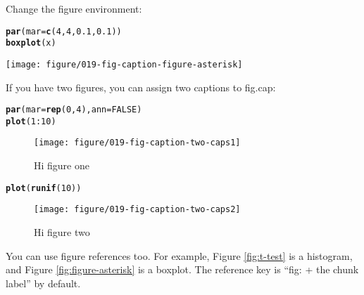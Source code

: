 \documentclass{article}\usepackage{graphicx, color}
\makeatletter
\def\maxwidth{ %
  \ifdim\Gin@nat@width>\linewidth
    \linewidth
  \else
    \Gin@nat@width
  \fi
}
\newcommand{\hlfunctioncall}[1]{\textcolor[rgb]{0.501960784313725,0,0.329411764705882}{\textbf{#1}}}%
\newenvironment{kframe}{%
 \def\at@end@of@kframe{}%
 \ifinner\ifhmode%
  \def\at@end@of@kframe{\end{minipage}}%
  \begin{minipage}{\columnwidth}%
 \fi\fi%
 \def\FrameCommand##1{\hskip\@totalleftmargin \hskip-\fboxsep
 \colorbox{shadecolor}{##1}\hskip-\fboxsep
     \hskip-\linewidth \hskip-\@totalleftmargin \hskip\columnwidth}%
 \MakeFramed {\advance\hsize-\width
   \@totalleftmargin\z@ \linewidth\hsize
   \@setminipage}}%
 {\par\unskip\endMakeFramed%
 \at@end@of@kframe}
\newenvironment{knitrout}{}{} %
\makeatother
\begin{document}
Change the figure environment:

\begin{knitrout}
\color{fgcolor}\begin{kframe}
\begin{alltt}
\hlfunctioncall{par}(mar = \hlfunctioncall{c}(4, 4, 0.1, 0.1))
\hlfunctioncall{boxplot}(x)
\end{alltt}
\end{kframe}\begin{figure*}[]

\texttt{[image: figure/019-fig-caption-figure-asterisk]} \caption[Figure * environment]{Figure * environment.\label{fig:figure-asterisk}}
\end{figure*}


\end{knitrout}


If you have two figures, you can assign two captions to fig.cap:

\begin{knitrout}
\color{fgcolor}\begin{kframe}
\begin{alltt}
\hlfunctioncall{par}(mar = \hlfunctioncall{rep}(0, 4), ann = FALSE)
\hlfunctioncall{plot}(1:10)
\end{alltt}
\end{kframe}\begin{figure}[]


{\centering \texttt{[image: figure/019-fig-caption-two-caps1]} 

}

\caption[Hi figure one]{Hi figure one\label{fig:two-caps1}}
\end{figure}

\begin{kframe}\begin{alltt}
\hlfunctioncall{plot}(\hlfunctioncall{runif}(10))
\end{alltt}
\end{kframe}\begin{figure}[]


{\centering \texttt{[image: figure/019-fig-caption-two-caps2]} 

}

\caption[Hi figure two]{Hi figure two\label{fig:two-caps2}}
\end{figure}


\end{knitrout}


You can use figure references too. For example, Figure \ref{fig:t-test} is a histogram, and Figure \ref{fig:figure-asterisk} is a boxplot. The reference key is ``fig: + the chunk label'' by default.
\end{document}
